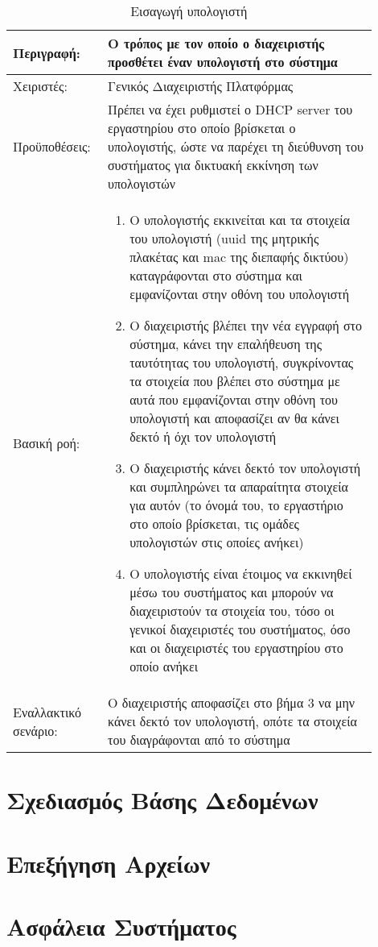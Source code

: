 \begin{table}[h]
	\caption{Εισαγωγή υπολογιστή}
	\label{tab:use-case-add-computer}
	\begin{tabular}{|p{0.2\linewidth}|p{0.7\linewidth}|}
		\hline
		Περιγραφή: & Ο τρόπος με τον οποίο ο διαχειριστής προσθέτει έναν υπολογιστή στο σύστημα \\ \hline
		Χειριστές: & Γενικός Διαχειριστής Πλατφόρμας \\ \hline
		Προϋποθέσεις: & Πρέπει να έχει ρυθμιστεί ο DHCP server του εργαστηρίου στο οποίο βρίσκεται ο υπολογιστής, ώστε να παρέχει τη διεύθυνση του συστήματος για δικτυακή εκκίνηση των υπολογιστών \\ \hline
		Βασική ροή: & 
		\vspace{-0.5cm}
		\begin{enumerate}
			\item Ο υπολογιστής εκκινείται και τα στοιχεία του υπολογιστή (uuid της μητρικής πλακέτας και mac της διεπαφής δικτύου) καταγράφονται στο σύστημα και εμφανίζονται στην οθόνη του υπολογιστή
			\item Ο διαχειριστής βλέπει την νέα εγγραφή στο σύστημα, κάνει την επαλήθευση της ταυτότητας του υπολογιστή, συγκρίνοντας τα στοιχεία που βλέπει στο σύστημα με αυτά που εμφανίζονται στην οθόνη του υπολογιστή και αποφασίζει αν θα κάνει δεκτό ή όχι τον υπολογιστή
			\item Ο διαχειριστής κάνει δεκτό τον υπολογιστή και συμπληρώνει τα απαραίτητα στοιχεία για αυτόν (το όνομά του, το εργαστήριο στο οποίο βρίσκεται, τις ομάδες υπολογιστών στις οποίες ανήκει)
			\item Ο υπολογιστής είναι έτοιμος να εκκινηθεί μέσω του συστήματος και μπορούν να διαχειριστούν τα στοιχεία του, τόσο οι γενικοί διαχειριστές του συστήματος, όσο και οι διαχειριστές του εργαστηρίου στο οποίο ανήκει
		\end{enumerate}\vspace{-0.7cm} \\ \hline
		Εναλλακτικό σενάριο: & Ο διαχειριστής αποφασίζει στο βήμα 3 να μην κάνει δεκτό τον υπολογιστή, οπότε τα στοιχεία του διαγράφονται από το σύστημα \\ \hline
	\end{tabular}
\end{table}

\section{Σχεδιασμός Βάσης Δεδομένων}



\section{Επεξήγηση Αρχείων}

\section{Ασφάλεια Συστήματος}
